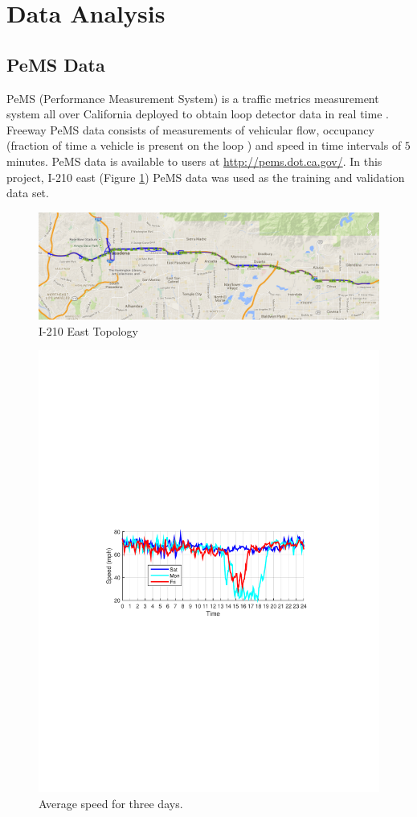 \documentclass[twocolumn,10pt]{asme2e}
\begin{document}
\section{Data Analysis}
\subsection{PeMS Data} 
PeMS (Performance Measurement System) is a traffic metrics measurement system all over California deployed to obtain loop detector data in real time \cite{PemsPravin}. Freeway PeMS data consists of measurements of vehicular flow, occupancy (fraction of time a vehicle is present on the loop \cite{occupancy}) and speed in time intervals of $5$ minutes. PeMS data is available to users at \url{http://pems.dot.ca.gov/}. In this project, I-210 east (Figure \ref{fig:210}) PeMS data was used as the training and validation data set. 
\begin{figure}[h]
    \centering
    \includegraphics[width=1\linewidth]{210.png}
    \caption{I-210 East Topology}
    \label{fig:210}
\end{figure} 

\begin{figure}[h]
	\centering
	\includegraphics[width=0.7\linewidth]{./Figures/spd1}
	\caption{Average speed for three days.}
	\label{fig:spd1}
\end{figure} 
\end{document}
